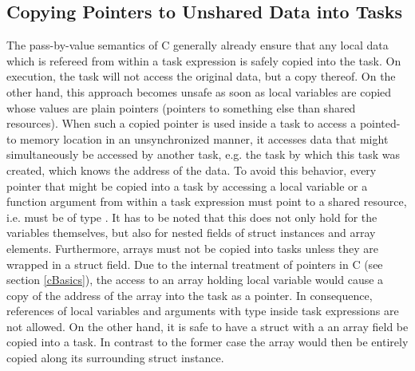 \subsection{Copying Pointers to Unshared Data into Tasks}
The pass-by-value semantics of C generally already ensure that any local data which is refereed from within a task expression is safely copied into the task. On execution, the task will not access the original data, but a copy thereof. On the other hand, this approach becomes unsafe as soon as local variables are copied whose values are plain pointers (pointers to something else than shared resources). When such a copied pointer is used inside a task to access a pointed-to memory location in an unsynchronized manner, it accesses data that might simultaneously be accessed by another task, e.g. the task by which this task was created, which knows the address of the data. To avoid this behavior, every pointer that might be copied into a task by accessing a local variable or a function argument from within a task expression must point to a shared resource, i.e. must be of type . It has to be noted that this does not only hold for the variables themselves, but also for nested fields of struct instances and array elements. Furthermore, arrays must not be copied into tasks unless they are wrapped in a struct field. Due to the internal treatment of pointers in C (see section \ref{cBasics}), the access to an array holding local variable would cause a copy of the address of the array into the task as a pointer. In consequence, references of local variables and arguments with type  inside task expressions are not allowed. On the other hand, it is safe to have a struct with a an array field be copied into a task. In contrast to the former case the array would then be entirely copied along its surrounding struct instance.

